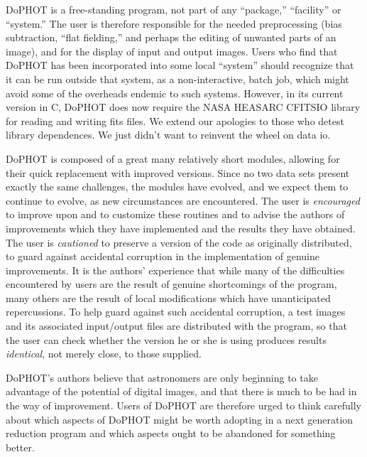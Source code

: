 DoPHOT is a free-standing program, not part of any
``package,'' ``facility'' or ``system.''  The user is
therefore responsible for the needed preprocessing (bias
subtraction, ``flat fielding,'' and perhaps the editing of
unwanted parts of an image), and for the display of input
and output images.  Users who find that DoPHOT has been
incorporated into some local ``system'' should recognize
that it can be run outside that system, as a
non-interactive, batch job, which might avoid some of the
overheads endemic to such systems.  However, in its
current version in C, DoPHOT does now require the NASA
HEASARC CFITSIO library for reading and writing fits files.
We extend our apologies to those who detest library 
dependences. We just didn't want to reinvent the wheel on 
data io.

DoPHOT is composed of a great many relatively short modules,
allowing for their quick replacement with improved versions.
Since no two data sets present exactly the same challenges,
the modules have evolved, and we expect them to continue to
evolve, as new circumstances are encountered.  The user is
{\it encouraged} to improve upon and to customize these routines
and to advise the authors of improvements which they have
implemented and the results they have obtained.  The user is
{\it cautioned} to preserve a version of 
the code as originally distributed, to
guard against accidental corruption in the implementation
of genuine improvements.  It is the authors' experience that
while many of the difficulties encountered by users are the
result of genuine shortcomings of the program, many others
are the result of local modifications which have
unanticipated repercussions.  To help guard against such
accidental corruption, a test images and its associated
input/output files  are
distributed with the program, so that the user can check
whether the version he or she is using produces results
{\it identical}, not merely close, to those supplied.

DoPHOT's authors believe that astronomers are only beginning
to take advantage of the potential of digital images, and
that there is much to be had in the way of improvement.
Users of DoPHOT are therefore urged to think carefully about
which aspects of DoPHOT might be worth adopting in a next
generation reduction program and which aspects ought to be
abandoned for something better.

